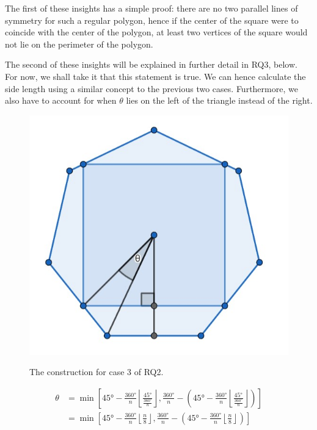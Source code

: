 \documentclass[12pt]{scrartcl}
\begin{document}
The first of these insights has a simple proof: there are no two parallel lines of symmetry for such a regular polygon, hence if the center of the square were to coincide with the center of the polygon, at least two vertices of the square would not lie on the perimeter of the polygon.

The second of these insights will be explained in further detail in RQ3, below. For now, we shall take it that this statement is true. We can hence calculate the side length using a similar concept to the previous two cases. Furthermore, we also have to account for when $\theta$ lies on the left of the triangle instead of the right.

\begin{figure}[htpb]
	\centering
	\includegraphics[scale=.75]{images/rq2_3.jpg}
	\label{fig:rq2_3_img}
	\caption{The construction for case 3 of RQ2.}
\end{figure}

\begin{align*}
  \theta & = \min\left[\ang{45} - \frac{\ang{360}}{n}\left\lfloor \frac{\ang{45}}{\frac{\ang{360}}{n}} \right\rfloor, \frac{\ang{360}}{n} - \left(\ang{45} - \frac{\ang{360}}{n}\left\lfloor \frac{\ang{45}}{\frac{\ang{360}}{n}} \right\rfloor\right)\right]     \\
  & = \min\left[\ang{45} - \frac{\ang{360}}{n}\left\lfloor \frac{n}{8} \right\rfloor, \frac{\ang{360}}{n} - \left(\ang{45} - \frac{\ang{360}}{n}\left\lfloor \frac{n}{8}\right\rfloor\right)\right]     \\
\end{align*}
\end{document}
